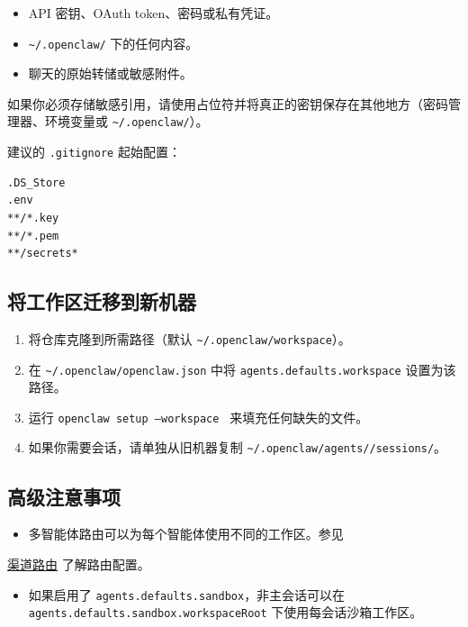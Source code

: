\begin{itemize}
  \item API 密钥、OAuth token、密码或私有凭证。
  \item \texttt{\textasciitilde{}/.openclaw/} 下的任何内容。
  \item 聊天的原始转储或敏感附件。
\end{itemize}


如果你必须存储敏感引用，请使用占位符并将真正的密钥保存在其他地方（密码管理器、环境变量或 \texttt{\textasciitilde{}/.openclaw/}）。

建议的 \texttt{.gitignore} 起始配置：

\begin{lstlisting}
.DS_Store
.env
**/*.key
**/*.pem
**/secrets*
\end{lstlisting}


\subsection{将工作区迁移到新机器}


\begin{enumerate}
  \item 将仓库克隆到所需路径（默认 \texttt{\textasciitilde{}/.openclaw/workspace}）。
  \item 在 \texttt{\textasciitilde{}/.openclaw/openclaw.json} 中将 \texttt{agents.defaults.workspace} 设置为该路径。
  \item 运行 \texttt{openclaw setup --workspace } 来填充任何缺失的文件。
  \item 如果你需要会话，请单独从旧机器复制 \texttt{\textasciitilde{}/.openclaw/agents//sessions/}。
\end{enumerate}


\subsection{高级注意事项}


\begin{itemize}
  \item 多智能体路由可以为每个智能体使用不同的工作区。参见
\end{itemize}

\href{/channels/channel-routing}{渠道路由} 了解路由配置。
\begin{itemize}
  \item 如果启用了 \texttt{agents.defaults.sandbox}，非主会话可以在 \texttt{agents.defaults.sandbox.workspaceRoot} 下使用每会话沙箱工作区。
\end{itemize}



